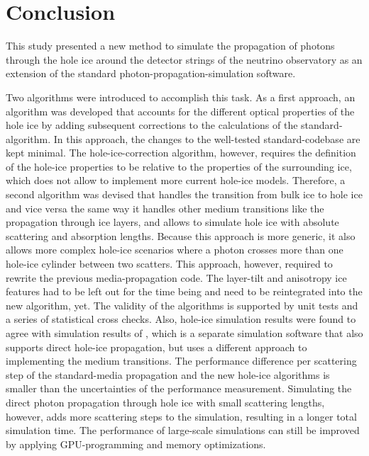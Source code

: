 
\section{Conclusion}
\label{sec:conclusion}

This study presented a new method to simulate the propagation of photons through the hole ice around the detector strings of the \icecube neutrino observatory as an extension of the standard \clsim photon-propagation-simulation software.

Two algorithms were introduced to accomplish this task.
As a first approach, an algorithm was developed that accounts for the different optical properties of the hole ice by adding subsequent corrections to the calculations of the standard-\clsim algorithm.
In this approach, the changes to the well-tested standard-\clsim codebase are kept minimal.
The hole-ice-correction algorithm, however, requires the definition of the hole-ice properties to be relative to the properties of the surrounding ice, which does not allow to implement more current hole-ice models.
Therefore, a second algorithm was devised that handles the transition from bulk ice to hole ice and vice versa the same way it handles other medium transitions like the propagation through ice layers, and allows to simulate hole ice with absolute scattering and absorption lengths.
Because this approach is more generic, it also allows more complex hole-ice scenarios where a photon crosses more than one hole-ice cylinder between two scatters.
This approach, however, required to rewrite the previous \clsim media-propagation code.
The layer-tilt and anisotropy ice features had to be left out for the time being and need to be reintegrated into the new algorithm, yet.
The validity of the algorithms is supported by unit tests and a series of statistical cross checks.
Also, \clsim hole-ice simulation results were found to agree with simulation results of \ppc, which is a separate \icecube simulation software that also supports direct hole-ice propagation, but uses a different approach to implementing the medium transitions.
The performance difference per scattering step of the standard-\clsim media propagation and the new hole-ice algorithms is smaller than the uncertainties of the performance measurement.
Simulating the direct photon propagation through hole ice with small scattering lengths, however, adds more scattering steps to the simulation, resulting in a longer total simulation time.
The performance of large-scale simulations can still be improved by applying GPU-programming and memory optimizations.


